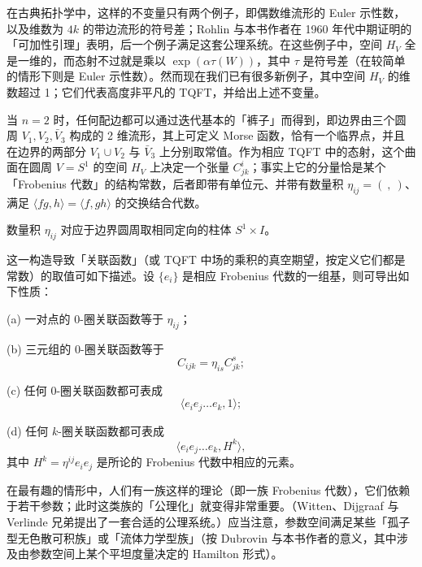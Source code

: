 在古典拓扑学中，这样的不变量只有两个例子，即偶数维流形的 Euler 示性数，以及维数为 $4k$ 的带边流形的符号差；Rohlin 与本书作者在 1960 年代中期证明的「可加性引理」表明，后一个例子满足这套公理系统。在这些例子中，空间 $H_V$ 全是一维的，而态射不过就是乘以 $\exp(\alpha\tau(W))$，其中 $\tau$ 是符号差（在较简单的情形下则是 Euler 示性数）。然而现在我们已有很多新例子，其中空间 $H_V$ 的维数超过 1；它们代表高度非平凡的 TQFT，并给出上述不变量。

当 $n=2$ 时，任何配边都可以通过迭代基本的「裤子」而得到，即边界由三个圆周 $V_1,V_2,\bar V_3$ 构成的 2 维流形，其上可定义 Morse 函数，恰有一个临界点，并且在边界的两部分 $V_1\cup V_2$ 与 $\bar V_3$ 上分别取常值。作为相应 TQFT 中的态射，这个曲面在圆周 $V=S^1$ 的空间 $H_V$ 上决定一个张量 $C_{jk}^i$；事实上它的分量恰是某个「Frobenius 代数」的结构常数，后者即带有单位元、并带有数量积 $\eta_{ij}=(\ ,\ )$、满足 $\langle fg,h\rangle=\langle f,gh\rangle$ 的交换结合代数。



数量积 $\eta_{ij}$ 对应于边界圆周取相同定向的柱体 $S^1\times I$。

这一构造导致「关联函数」（或 TQFT 中场的乘积的真空期望，按定义它们都是常数）的取值可如下描述。设 $\{e_i\}$ 是相应 Frobenius 代数的一组基，则可导出如下性质：

(a) 一对点的 $0$-圈关联函数等于 $\eta_{ij}$；

(b) 三元组的 $0$-圈关联函数等于
\[
C_{ijk}=\eta_{is}C_{jk}^s;
\]

(c) 任何 $0$-圈关联函数都可表成
\[
\langle e_ie_j\dots e_k,1\rangle;
\]

(d) 任何 $k$-圈关联函数都可表成
\[
\langle e_ie_j\dots e_k,H^k\rangle,
\]
其中 $H^k=\eta^{ij}e_ie_j$ 是所论的 Frobenius 代数中相应的元素。

在最有趣的情形中，人们有一族这样的理论（即一族 Frobenius 代数），它们依赖于若干参数；此时这类族的「公理化」就变得非常重要。（Witten、Dijgraaf 与 Verlinde 兄弟提出了一套合适的公理系统。）应当注意，参数空间满足某些「孤子型无色散可积族」或「流体力学型族」（按 Dubrovin 与本书作者的意义，其中涉及由参数空间上某个平坦度量决定的 Hamilton 形式）。

